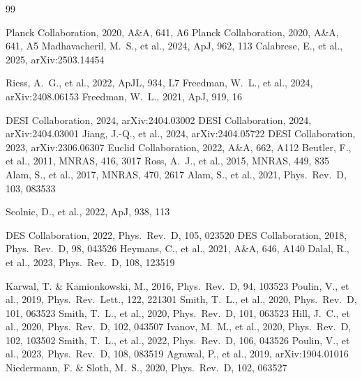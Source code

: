 \documentclass[a4paper,11pt]{article}
\begin{document}
\begin{thebibliography}{99}

 Planck Collaboration, 2020, A\&A, 641, A6
 Planck Collaboration, 2020, A\&A, 641, A5
 Madhavacheril, M.~S., et al., 2024, ApJ, 962, 113
 Calabrese, E., et al., 2025, arXiv:2503.14454

 Riess, A.~G., et al., 2022, ApJL, 934, L7
 Freedman, W.~L., et al., 2024, arXiv:2408.06153
 Freedman, W.~L., 2021, ApJ, 919, 16

 DESI Collaboration, 2024, arXiv:2404.03002
 DESI Collaboration, 2024, arXiv:2404.03001
 Jiang, J.-Q., et al., 2024, arXiv:2404.05722
 DESI Collaboration, 2023, arXiv:2306.06307
 Euclid Collaboration, 2022, A\&A, 662, A112
 Beutler, F., et al., 2011, MNRAS, 416, 3017
 Ross, A.~J., et al., 2015, MNRAS, 449, 835
 Alam, S., et al., 2017, MNRAS, 470, 2617
 Alam, S., et al., 2021, Phys.\ Rev.\ D, 103, 083533

 Scolnic, D., et al., 2022, ApJ, 938, 113

 DES Collaboration, 2022, Phys.\ Rev.\ D, 105, 023520
 DES Collaboration, 2018, Phys.\ Rev.\ D, 98, 043526
 Heymans, C., et al., 2021, A\&A, 646, A140
 Dalal, R., et al., 2023, Phys.\ Rev.\ D, 108, 123519

 Karwal, T. \& Kamionkowski, M., 2016, Phys.\ Rev.\ D, 94, 103523
 Poulin, V., et al., 2019, Phys.\ Rev.\ Lett., 122, 221301
 Smith, T.~L., et al., 2020, Phys.\ Rev.\ D, 101, 063523
 Smith, T.~L., et al., 2020, Phys.\ Rev.\ D, 101, 063523  %
 Hill, J.~C., et al., 2020, Phys.\ Rev.\ D, 102, 043507
 Ivanov, M.~M., et al., 2020, Phys.\ Rev.\ D, 102, 103502
 Smith, T.~L., et al., 2022, Phys.\ Rev.\ D, 106, 043526
 Poulin, V., et al., 2023, Phys.\ Rev.\ D, 108, 083519
 Agrawal, P., et al., 2019, arXiv:1904.01016
 Niedermann, F. \& Sloth, M.~S., 2020, Phys.\ Rev.\ D, 102, 063527


\end{thebibliography}
\end{document}
